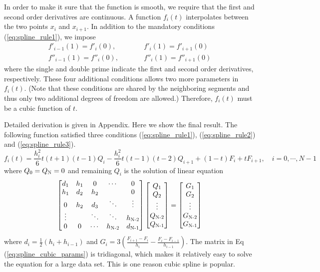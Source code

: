 In order to make it sure that the function is smooth, we require that the first and second order derivatives are continuous.
A function  $f_i(t)$ interpolates between  the two points $x_i$ and $x_{i+1}$. In addition to the mandatory conditions (\ref{eq:spline_rule1}), we impose
\begin{eqnarray}
f'_{i-1}(1) = f'_i(0), &\qquad & f'_i(1)=f'_{i+1}(0) \label{eq:spline_rule2}\\
f''_{i-1}(1) = f''_i(0), &\qquad & f''_i(1)=f''_{i+1}(0)  \label{eq:spline_rule3}
\end{eqnarray}
where the single and double prime indicate the first and second order derivatives, respectively.
These four additional conditions allows two more parameters in $f_i(t)$. (Note that these conditions are shared by the neighboring segments and thus only two additional degrees of freedom are allowed.)  Therefore, $f_i(t)$ must be a cubic function of $t$.

Detailed derivation is given in Appendix.  Here we show the final result.  The following function satisfied three conditions
(\ref{eq:spline_rule1}), (\ref{eq:spline_rule2}) and (\ref{eq:spline_rule3}).
\begin{equation}\label{eq:spline_cubic}
f_i(t) = \frac{h_i^2}{6} t (t+1)(t-1) Q_i -  \frac{h_i^2}{6} t (t-1)(t-2) Q_{i+1} + (1-t) F_i + t F_{i+1}, \quad i=0, \cdots, N-1
\end{equation}
where $Q_0=Q_\textsc{N}=0$ and remaining $Q_i$ is the solution of linear equation
\begin{equation}\label{eq:spline_cubic_params}
\begin{bmatrix}
d_1    & h_1 & 0      & \cdots         &  0 \\
h_1    & d_2 & h_2    &                &  0 \\
0      & h_2 & d_3    & \ddots         &  \vdots \\
\vdots &     & \ddots & \ddots         &  h_\textsc{N-2} \\
0      &  0  & \cdots & h_\textsc{N-2} &  d_\text{N-1} 
\end{bmatrix}
\begin{bmatrix}
Q_1 \\ Q_2 \\ \vdots\\ Q_\textsc{N-2} \\ Q_\textsc{N-1}
\end{bmatrix}
=
  \begin{bmatrix}
G_1 \\ G_2 \\ \vdots\\ G_\textsc{N-2} \\ G_\textsc{N-1}
\end{bmatrix}    
\end{equation}
where $d_i=\displaystyle\frac{1}{2} (h_i+h_{i-1})$ and $G_i = 3 \left ( \displaystyle\frac{F_{i+1}-F_i}{h_i} - \displaystyle\frac{F_i-F_{i-1}}{h_{i-1}} \right )$. The matrix in Eq (\ref{eq:spline_cubic_params}) is tridiagonal, which makes it relatively easy to solve the equation for a large data set.  This is one reason cubic spline is popular.

